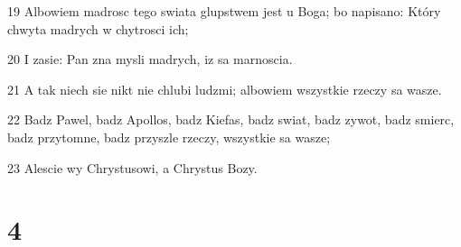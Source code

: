 \par 19 Albowiem madrosc tego swiata glupstwem jest u Boga; bo napisano: Który chwyta madrych w chytrosci ich;
\par 20 I zasie: Pan zna mysli madrych, iz sa marnoscia.
\par 21 A tak niech sie nikt nie chlubi ludzmi; albowiem wszystkie rzeczy sa wasze.
\par 22 Badz Pawel, badz Apollos, badz Kiefas, badz swiat, badz zywot, badz smierc, badz przytomne, badz przyszle rzeczy, wszystkie sa wasze;
\par 23 Alescie wy Chrystusowi, a Chrystus Bozy.

\chapter{4}

